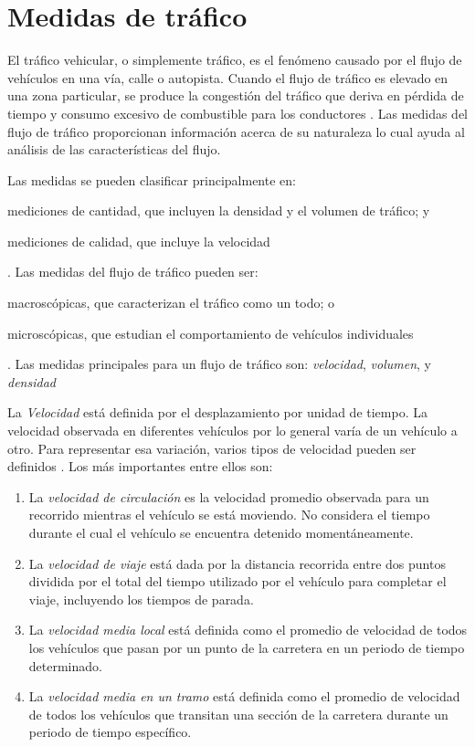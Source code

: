 \section{Medidas de tráfico}
\label{sec:medidas_trafico}

El tráfico vehicular, o simplemente tráfico, es el fenómeno causado por el flujo de vehículos en una vía, calle o autopista. Cuando el flujo de tráfico es elevado en una zona particular, se produce la congestión del tráfico que deriva en pérdida de tiempo y consumo excesivo de combustible para los conductores \cite{litman2011smart}. Las medidas del flujo de tráfico proporcionan información acerca de su naturaleza lo cual ayuda al análisis de las características del flujo.

Las medidas se pueden clasificar principalmente en: \begin{enumerate*}[a)]
\item mediciones de cantidad, que incluyen la densidad y el volumen de tráfico; y \item mediciones de calidad, que incluye la velocidad
\end{enumerate*}. Las medidas del flujo de tráfico pueden ser: \begin{enumerate*}[a)] \item macroscópicas, que caracterizan el tráfico como un todo; o \item microscópicas, que estudian el comportamiento de vehículos individuales \end{enumerate*}. Las medidas principales para un flujo de tráfico son: \emph{velocidad}, \emph{volumen}, y \emph{densidad} \cite{may1990fundamentals}

La \emph{Velocidad} está definida por el desplazamiento por unidad de tiempo. La velocidad observada en diferentes vehículos por lo general varía de un vehículo a otro. Para representar esa variación, varios tipos de velocidad pueden ser definidos \cite{may1990fundamentals}. Los más importantes entre ellos son: 
\begin{enumerate}

\item La \emph{velocidad de circulación} es la velocidad promedio observada para un recorrido mientras el vehículo se está moviendo. No considera el tiempo durante el cual el vehículo se encuentra detenido momentáneamente.

\item La \emph{velocidad de viaje} está dada por la distancia recorrida entre dos puntos dividida por el total del tiempo utilizado por el vehículo para completar el viaje, incluyendo los tiempos de parada. 

\item La \emph{velocidad media local} está definida como el promedio de velocidad de todos los vehículos que pasan por un punto de la carretera en un periodo de tiempo determinado.

\item La \emph{velocidad media en un tramo} está definida como el promedio de velocidad de todos los vehículos que transitan una sección de la carretera durante un periodo de tiempo específico.
\end{enumerate}

